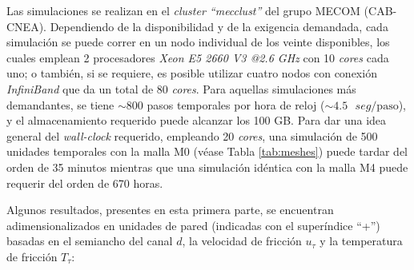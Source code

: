 Las simulaciones se realizan en el \textit{cluster ``mecclust''} del grupo MECOM (CAB-CNEA). Dependiendo de la disponibilidad y de la exigencia demandada, cada simulación se puede \linebreak correr en un nodo individual de los veinte disponibles, los cuales emplean 2 procesadores \textit{Xeon E5 2660 V3 @2.6 GHz} con 10 \textit{cores} cada uno; o también, si se requiere, es posible utilizar cuatro nodos con conexión \textit{InfiniBand} que da un total de 80 \textit{cores}. Para aquellas simulaciones más demandantes, se tiene $\sim 800$ pasos temporales por hora de reloj ($\sim 4\text{.}5 \text{ } seg/\text{paso}$), y el almacenamiento requerido puede alcanzar los 100 GB. Para dar una idea general del \textit{wall-clock} requerido, empleando 20 \textit{cores}, una simulación de 500 unidades temporales con la malla M0 (véase Tabla \ref{tab:meshes}) puede tardar del orden de 35 minutos mientras que una simulación idéntica con la malla M4 puede requerir del orden de 670 horas.       


\begin{table}[H]
\centering
{}
\caption{Distintas resoluciones espaciales y temporales utilizadas en las simulaciones de validación. Debido a que la discretización en la dirección $Y$ es no uniforme, se reporta el máximo $\Delta y$ asociado.}
\label{tab:meshes}
\end{table}

Algunos resultados, presentes en esta primera parte, se encuentran adimensionalizados en unidades de pared (indicadas con el superíndice ``+'') basadas en el semiancho del canal $d$, la velocidad de fricción $u_{\tau}$ y la temperatura de fricción $T_{\tau}$:

